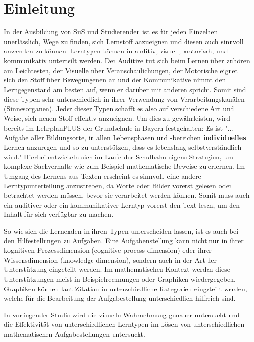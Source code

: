 \chapter{Einleitung}

In der Ausbildung von \gls{SuS} und Studierenden ist es für jeden Einzelnen unerlässlich, Wege zu finden, sich Lernstoff anzueignen und diesen auch sinnvoll anwenden zu können. Lerntypen können in auditiv, visuell, motorisch, und kommunikativ unterteilt werden. Der Auditive tut sich beim Lernen über zuhören am Leichtesten, der Visuelle über Veranschaulichungen, der Motorische eignet sich den Stoff über Bewegungenen an und der Kommunikative nimmt den Lerngegenstand am besten auf, wenn er darüber mit anderen spricht.  Somit sind diese Typen sehr unterschiedlich in ihrer Verwendung von Verarbeitungskanälen (Sinnesorganen).
Jeder dieser Typen schafft es also auf verschiedene Art und Weise, sich neuen Stoff effektiv anzueignen.
Um dies zu gewährleisten, wird bereits im LehrplanPLUS der Grundschule in Bayern festgehalten:
Es ist "... Aufgabe aller Bildungsorte, in allen Lebensphasen und -bereichen \textbf{individuelles}
Lernen anzuregen und so zu unterstützen, dass es lebenslang selbstverständlich wird."
\cite{LehrplanGrundschule}
Hierbei entwickeln sich im Laufe der Schulbahn eigene Strategien, um komplexe Sachverhalte
wie zum Beispiel mathematische Beweise zu erlernen. 
Im Umgang des Lernens aus Texten erscheint es sinnvoll, eine andere Lerntypunterteilung anzustreben, da Worte oder Bilder vorerst gelesen oder betrachtet werden müssen, bevor sie verarbeitet werden können. Somit muss auch ein auditiver oder ein kommunikativer Lerntyp vorerst den Text lesen, um den Inhalt für sich verfügbar zu machen. 

So wie sich die Lernenden in ihren Typen unterscheiden lassen, ist es auch bei den Hilfestellungen zu Aufgaben. Eine Aufgabenstellung kann nicht nur in ihrer kognitiven Prozessdimension (cognitive process dimension) oder ihrer Wissensdimension (knowledge dimension)\cite{anderson2001taxonomy}, sondern auch in der Art der Unterstützung eingeteilt werden. Im mathematischen Kontext werden diese Unterstützungen meist in Beispielrechnungen oder Graphiken wiedergegeben. Graphiken können laut Zitation in unterschiedliche Kategorien eingeteilt werden, welche für die Bearbeitung der Aufgabestellung unterschiedlich hilfreich sind. 

In vorliegender Studie wird die visuelle Wahrnehmung genauer untersucht und die Effektivität von unterschiedlichen Lerntypen im Lösen von unterschiedlichen mathematischen Aufgabestellungen untersucht. 